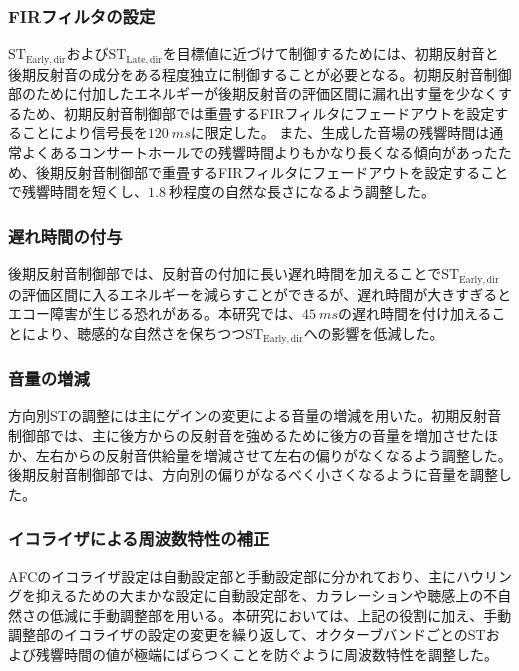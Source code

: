 \documentclass[11pt,a4j]{jreport}
\begin{document}
\subsubsection{FIRフィルタの設定}
$\mathrm{ST_{Early,dir}}$および$\mathrm{ST_{Late,dir}}$を目標値に近づけて制御するためには、初期反射音と後期反射音の成分をある程度独立に制御することが必要となる。初期反射音制御部のために付加したエネルギーが後期反射音の評価区間に漏れ出す量を少なくするため、初期反射音制御部では重畳するFIRフィルタにフェードアウトを設定することにより信号長を$\SI{120}{ms}$に限定した。
また、生成した音場の残響時間は通常よくあるコンサートホールでの残響時間よりもかなり長くなる傾向があったため、後期反射音制御部で重畳するFIRフィルタにフェードアウトを設定することで残響時間を短くし、$\SI{1.8}{秒}$程度の自然な長さになるよう調整した。
  
\subsubsection{遅れ時間の付与}
後期反射音制御部では、反射音の付加に長い遅れ時間を加えることで$\mathrm{ST_{Early,dir}}$の評価区間に入るエネルギーを減らすことができるが、遅れ時間が大きすぎるとエコー障害が生じる恐れがある。本研究では、$\SI{45}{ms}$の遅れ時間を付け加えることにより、聴感的な自然さを保ちつつ$\mathrm{ST_{Early,dir}}$への影響を低減した。

\subsubsection{音量の増減}
方向別STの調整には主にゲインの変更による音量の増減を用いた。初期反射音制御部では、主に後方からの反射音を強めるために後方の音量を増加させたほか、左右からの反射音供給量を増減させて左右の偏りがなくなるよう調整した。後期反射音制御部では、方向別の偏りがなるべく小さくなるように音量を調整した。

\subsubsection{イコライザによる周波数特性の補正}
AFCのイコライザ設定は自動設定部と手動設定部に分かれており、主にハウリングを抑えるための大まかな設定に自動設定部を、カラレーションや聴感上の不自然さの低減に手動調整部を用いる。本研究においては、上記の役割に加え、手動調整部のイコライザの設定の変更を繰り返して、オクターブバンドごとのSTおよび残響時間の値が極端にばらつくことを防ぐように周波数特性を調整した。

\end{document}
